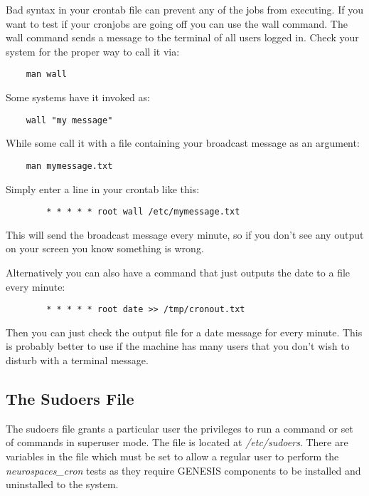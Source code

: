 \documentclass[12pt]{article}
\begin{document}
Bad syntax in your crontab file can prevent any of the jobs from executing. If you want to test if your cronjobs are going off you can use the wall command. The wall command sends a message to the terminal of all users logged in. Check your system for the proper way to call it via:

\begin{verbatim}
	man wall
\end{verbatim}

Some systems have it invoked as:

\begin{verbatim}
	wall "my message"
\end{verbatim}

While some call it with a file containing your broadcast message as an argument:

\begin{verbatim}
	man mymessage.txt
\end{verbatim}

Simply enter a line in your crontab like this:

\begin{verbatim}
		* * * * * root wall /etc/mymessage.txt
\end{verbatim}

This will send the broadcast message every minute, so if you don't see any output on your screen you know something is wrong.

Alternatively you can also have a command that just outputs the date to a file every minute:

\begin{verbatim}
		* * * * * root date >> /tmp/cronout.txt
\end{verbatim}

Then you can just check the output file for a date message for every minute. This is probably better to use if the machine has many users that you don't wish to disturb with a terminal message.

\subsection*{The Sudoers File}

The sudoers file grants a particular user the privileges to run a command or set of commands in superuser mode. The file is located at {\it /etc/sudoers}. There are variables in the file which must be set to allow a regular user to perform the {\it neurospaces\_cron} tests as they require GENESIS components to be installed and uninstalled to the system.
\end{document}

